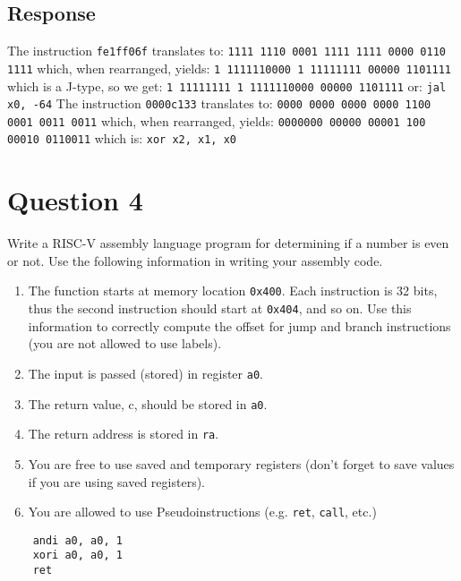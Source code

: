 \documentclass{article}
\begin{document}
\subsection*{Response}
The instruction \texttt{fe1ff06f} translates to:
\newline
\texttt{1111 1110 0001 1111 1111 0000 0110 1111} which, when rearranged, yields:
\newline
\texttt{1 1111110000 1 11111111 00000 1101111} which is a J-type, so we get:
\newline
\texttt{1 11111111 1 1111110000 00000 1101111} or:
\newline
\texttt{jal x0, -64}
\newline
\newline
\newline
The instruction \texttt{0000c133} translates to:
\newline
\texttt{0000 0000 0000 0000 1100 0001 0011 0011} which, when rearranged, yields:
\newline
\texttt{0000000 00000 00001 100 00010 0110011} which is:
\newline
\newline
\texttt{xor x2, x1, x0}





\newpage
\section*{Question 4}
Write a RISC-V assembly language program for determining if a number is even or not.
\newline
\newline
Use the following information in writing your assembly code.
\begin{enumerate}
\item The function starts at memory location \texttt{0x400}. Each instruction is 32 bits, thus the
  second instruction should start at \texttt{0x404}, and so on. Use this information to correctly
  compute the offset for jump and branch instructions (you are not allowed to use labels).
\item The input is passed (stored) in register \texttt{a0}.
\item The return value, c, should be stored in \texttt{a0}.
\item The return address is stored in \texttt{ra}.
\item You are free to use saved and temporary registers (don't forget to save values if you are
  using saved registers).
\item You are allowed to use Pseudoinstructions (e.g. \texttt{ret}, \texttt{call}, etc.)
\end{enumerate}

\begin{verbatim}
    andi a0, a0, 1
    xori a0, a0, 1
    ret
\end{verbatim}
\end{document}
